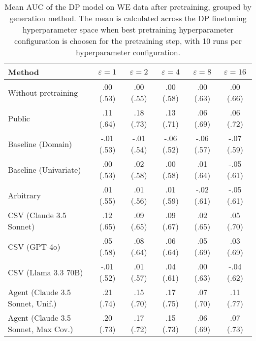 \begin{table}[h!]
    \centering
    \caption{Mean AUC of the DP model on WE data after pretraining, grouped by generation method. The mean is calculated across the DP finetuning hyperparameter space when best pretraining hyperparameter configuration is choosen for the pretraining step, with 10 runs per hyperparameter configuration.}
    \label{tab:epsilon_comparison}
    \begin{tabular}{lccccc}
    \toprule
    Method & $\varepsilon=1$ & $\varepsilon=2$ & $\varepsilon=4$ & $\varepsilon=8$ & $\varepsilon=16$ \\
    \midrule
    Without pretraining & .00 {\small (.53)} & .00 {\small (.55)} & .00 {\small (.58)} & .00 {\small (.63)} & .00 {\small (.66)} \\
    \arrayrulecolor{black!50!}\midrule
    Public & .11 {\small (.64)} & \cellcolor{gold!30}.18 {\small (.73)} & .13 {\small (.71)} & \cellcolor{bronze!30}.06 {\small (.69)} & .06 {\small (.72)} \\
    \arrayrulecolor{black!50!}\midrule
    Baseline (Domain) & -.01 {\small (.53)} & -.01 {\small (.54)} & -.06 {\small (.52)} & -.06 {\small (.57)} & -.07 {\small (.59)} \\
    Baseline (Univariate) & .00 {\small (.53)} & .02 {\small (.58)} & .00 {\small (.58)} & .01 {\small (.64)} & -.05 {\small (.61)} \\
    \arrayrulecolor{black!50!}\midrule
    Arbitrary & .01 {\small (.55)} & .01 {\small (.56)} & .01 {\small (.59)} & -.02 {\small (.61)} & -.05 {\small (.61)} \\
    \arrayrulecolor{black!50!}\midrule
    CSV (Claude 3.5 Sonnet) & \cellcolor{bronze!30}.12 {\small (.65)} & .09 {\small (.65)} & .09 {\small (.67)} & .02 {\small (.65)} & .05 {\small (.70)} \\
    CSV (GPT-4o) & .05 {\small (.58)} & .08 {\small (.64)} & .06 {\small (.64)} & .05 {\small (.69)} & .03 {\small (.69)} \\
    CSV (Llama 3.3 70B) & -.01 {\small (.52)} & .01 {\small (.57)} & .04 {\small (.61)} & .00 {\small (.63)} & -.04 {\small (.62)} \\
    \arrayrulecolor{black!50!}\midrule
    Agent (Claude 3.5 Sonnet, Unif.) & \cellcolor{gold!30}.21 {\small (.74)} & .15 {\small (.70)} & \cellcolor{gold!30}.17 {\small (.75)} & \cellcolor{silver!30}.07 {\small (.70)} & \cellcolor{gold!30}.11 {\small (.77)} \\
    Agent (Claude 3.5 Sonnet, Max Cov.) & \cellcolor{silver!30}.20 {\small (.73)} & \cellcolor{silver!30}.17 {\small (.72)} & \cellcolor{silver!30}.15 {\small (.73)} & .06 {\small (.69)} & \cellcolor{bronze!30}.07 {\small (.73)} \\

\end{tabular}
\end{table}
